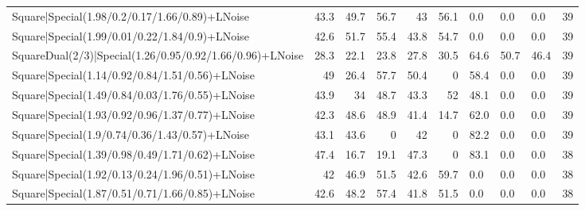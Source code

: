 \begin{tabular}{lrrrrrlllr}
 Square|Special(1.98/0.2/0.17/1.66/0.89)+LNoise                  &            43.3 &            49.7 &            56.7 &            43   &           56.1 & 0.0             & 0.0            & 0.0            &           39 \\
 Square|Special(1.99/0.01/0.22/1.84/0.9)+LNoise                  &            42.6 &            51.7 &            55.4 &            43.8 &           54.7 & 0.0             & 0.0            & 0.0            &           39 \\
 SquareDual(2/3)|Special(1.26/0.95/0.92/1.66/0.96)+LNoise        &            28.3 &            22.1 &            23.8 &            27.8 &           30.5 & 64.6            & 50.7           & 46.4           &           39 \\
 Square|Special(1.14/0.92/0.84/1.51/0.56)+LNoise                 &            49   &            26.4 &            57.7 &            50.4 &            0   & 58.4            & 0.0            & 0.0            &           39 \\
 Square|Special(1.49/0.84/0.03/1.76/0.55)+LNoise                 &            43.9 &            34   &            48.7 &            43.3 &           52   & 48.1            & 0.0            & 0.0            &           39 \\
 Square|Special(1.93/0.92/0.96/1.37/0.77)+LNoise                 &            42.3 &            48.6 &            48.9 &            41.4 &           14.7 & 62.0            & 0.0            & 0.0            &           39 \\
 Square|Special(1.9/0.74/0.36/1.43/0.57)+LNoise                  &            43.1 &            43.6 &             0   &            42   &            0   & 82.2            & 0.0            & 0.0            &           39 \\
 Square|Special(1.39/0.98/0.49/1.71/0.62)+LNoise                 &            47.4 &            16.7 &            19.1 &            47.3 &            0   & 83.1            & 0.0            & 0.0            &           38 \\
 Square|Special(1.92/0.13/0.24/1.96/0.51)+LNoise                 &            42   &            46.9 &            51.5 &            42.6 &           59.7 & 0.0             & 0.0            & 0.0            &           38 \\
 Square|Special(1.87/0.51/0.71/1.66/0.85)+LNoise                 &            42.6 &            48.2 &            57.4 &            41.8 &           51.5 & 0.0             & 0.0            & 0.0            &           38 \\

\end{tabular}
